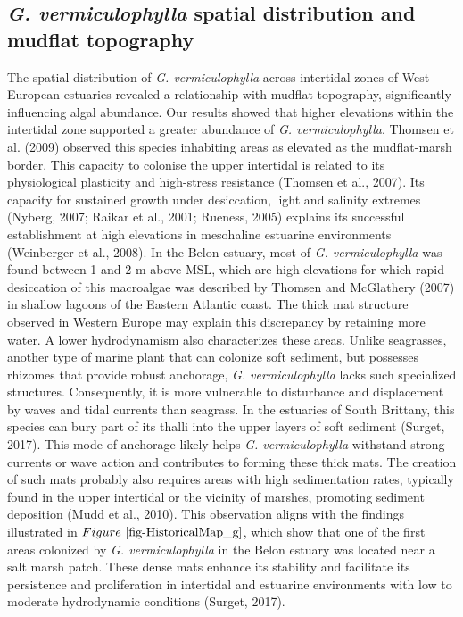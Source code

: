 \documentclass[
  letterpaper,
  11pt,
  english,
  singlespacing,
  headsepline]{MastersDoctoralThesis}
\begin{document}
\begin{spacing}{1.5}
\subsection{\texorpdfstring{\emph{G. vermiculophylla} spatial
distribution and mudflat
topography}{G. vermiculophylla spatial distribution and mudflat topography}}\label{g.-vermiculophylla-spatial-distribution-and-mudflat-topography}

The spatial distribution of \emph{G. vermiculophylla} across intertidal
zones of West European estuaries revealed a relationship with mudflat
topography, significantly influencing algal abundance. Our results
showed that higher elevations within the intertidal zone supported a
greater abundance of \emph{G. vermiculophylla}. Thomsen et al. (2009)
observed this species inhabiting areas as elevated as the mudflat-marsh
border. This capacity to colonise the upper intertidal is related to its
physiological plasticity and high-stress resistance (Thomsen et al.,
2007). Its capacity for sustained growth under desiccation, light and
salinity extremes (Nyberg, 2007; Raikar et al., 2001; Rueness, 2005)
explains its successful establishment at high elevations in mesohaline
estuarine environments (Weinberger et al., 2008). In the Belon estuary,
most of \emph{G. vermiculophylla} was found between 1 and 2 m above MSL,
which are high elevations for which rapid desiccation of this macroalgae
was described by Thomsen and McGlathery (2007) in shallow lagoons of the
Eastern Atlantic coast. The thick mat structure observed in Western
Europe may explain this discrepancy by retaining more water. A lower
hydrodynamism also characterizes these areas. Unlike seagrasses, another
type of marine plant that can colonize soft sediment, but possesses
rhizomes that provide robust anchorage, \emph{G. vermiculophylla} lacks
such specialized structures. Consequently, it is more vulnerable to
disturbance and displacement by waves and tidal currents than seagrass.
In the estuaries of South Brittany, this species can bury part of its
thalli into the upper layers of soft sediment (Surget, 2017). This mode
of anchorage likely helps \emph{G. vermiculophylla} withstand strong
currents or wave action and contributes to forming these thick mats. The
creation of such mats probably also requires areas with high
sedimentation rates, typically found in the upper intertidal or the
vicinity of marshes, promoting sediment deposition (Mudd et al., 2010).
This observation aligns with the findings illustrated in
\(Figure~\ref{fig-HistoricalMap_g}\), which show that one of the first
areas colonized by \emph{G. vermiculophylla} in the Belon estuary was
located near a salt marsh patch. These dense mats enhance its stability
and facilitate its persistence and proliferation in intertidal and
estuarine environments with low to moderate hydrodynamic conditions
(Surget, 2017).


\end{spacing}
\end{document}
